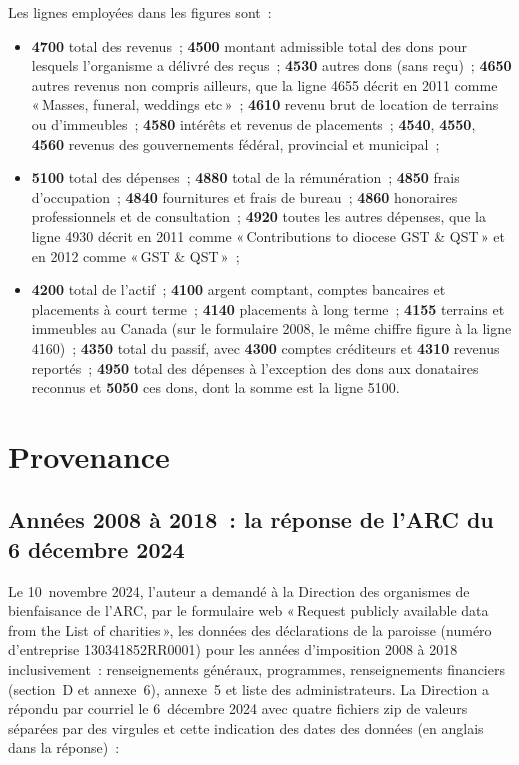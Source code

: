 \documentclass[11pt,letterpaper]{article}
\begin{document}
Les lignes employées dans les figures sont~:
\begin{itemize}[nosep,leftmargin=1.4em]
\item \textbf{4700} total des revenus~; \textbf{4500} montant admissible total des dons pour lesquels l'organisme a délivré des reçus~; \textbf{4530} autres dons (sans reçu)~; \textbf{4650} autres revenus non compris ailleurs, que la ligne 4655 décrit en 2011 comme «\,Masses, funeral, weddings etc\,»~; \textbf{4610} revenu brut de location de terrains ou d'immeubles~; \textbf{4580} intérêts et revenus de placements~; \textbf{4540}, \textbf{4550}, \textbf{4560} revenus des gouvernements fédéral, provincial et municipal~;
\item \textbf{5100} total des dépenses~; \textbf{4880} total de la rémunération~; \textbf{4850} frais d'occupation~; \textbf{4840} fournitures et frais de bureau~; \textbf{4860} honoraires professionnels et de consultation~; \textbf{4920} toutes les autres dépenses, que la ligne 4930 décrit en 2011 comme «\,Contributions to diocese GST \& QST\,» et en 2012 comme «\,GST \& QST\,»~;
\item \textbf{4200} total de l'actif~; \textbf{4100} argent comptant, comptes bancaires et placements à court terme~; \textbf{4140} placements à long terme~; \textbf{4155} terrains et immeubles au Canada (sur le formulaire 2008, le même chiffre figure à la ligne 4160)~; \textbf{4350} total du passif, avec \textbf{4300} comptes créditeurs et \textbf{4310} revenus reportés~; \textbf{4950} total des dépenses à l'exception des dons aux donataires reconnus et \textbf{5050} ces dons, dont la somme est la ligne 5100.
\end{itemize}

\section{Provenance}\label{sec:prov}

\subsection{Années 2008 à 2018~: la réponse de l'ARC du 6 décembre 2024}

Le 10~novembre 2024, l'auteur a demandé à la Direction des organismes de bienfaisance de l'ARC, par le formulaire web «\,Request publicly available data from the List of charities\,», les données des déclarations de la paroisse (numéro d'entreprise 130341852RR0001) pour les années d'imposition 2008 à 2018 inclusivement~: renseignements généraux, programmes, renseignements financiers (section~D et annexe~6), annexe~5 et liste des administrateurs. La Direction a répondu par courriel le 6~décembre 2024 avec quatre fichiers zip de valeurs séparées par des virgules et cette indication des dates des données (en anglais dans la réponse)~:
\end{document}
